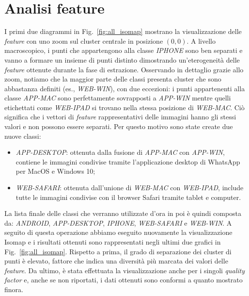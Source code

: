 \section{Analisi feature}
\label{sec:feaure_results}
I primi due diagrammi in Fig.~\ref{fig:all_isomap} mostrano la visualizzazione delle \textit{feature} con uno zoom sul cluster centrale in posizione $(0,0)$. A livello macroscopico, i punti che appartengono alla classe \textit{IPHONE} sono ben separati e vanno a formare un insieme di punti distinto dimostrando un'eterogeneità delle \textit{feature} ottenute durante la fase di estrazione. Osservando in dettaglio grazie allo zoom, notiamo che la maggior parte delle classi presenta cluster che sono abbastanza definiti (es., \textit{WEB-WIN}), con due eccezioni: i punti appartenenti alla classe \textit{APP-MAC} sono perfettamente sovrapposti a \textit{APP-WIN} mentre quelli etichettati come \textit{WEB-IPAD} si trovano nella stessa posizione di \textit{WEB-MAC}. Ciò significa che i vettori di \textit{feature} rappresentativi delle immagini hanno gli stessi valori e non possono essere separati. Per questo motivo sono state create due nuove classi:

\begin{itemize}
    \item \textit{APP-DESKTOP}: ottenuta dalla fusione di \textit{APP-MAC} con \textit{APP-WIN}, contiene le immagini condivise tramite l'applicazione desktop di WhatsApp per MacOS e Windows 10;
    
    \item \textit{WEB-SAFARI}: ottenuta dall'unione di \textit{WEB-MAC} con \textit{WEB-IPAD}, include tutte le immagini condivise con il browser Safari tramite tablet e computer.
\end{itemize}

La lista finale delle classi che verranno utilizzate d'ora in poi è quindi composta da: \textit{ANDROID}, \textit{APP-DESKTOP}, \textit{IPHONE}, \textit{WEB-SAFARI} e \textit{WEB-WIN}. A seguito di questa operazione abbiamo eseguito nuovamente la visualizzazione Isomap e i risultati ottenuti sono rappresentati negli ultimi due grafici in Fig.~\ref{fig:all_isomap}. Rispetto a prima, il grado di separazione dei cluster di punti è elevato, fattore che indica una diversità più marcata dei valori delle \textit{feature}. Da ultimo, è stata effettuata la visualizzazione anche per i singoli \textit{quality factor} e, anche se non riportati, i dati ottenuti sono conformi a quanto mostrato finora.\\\\


